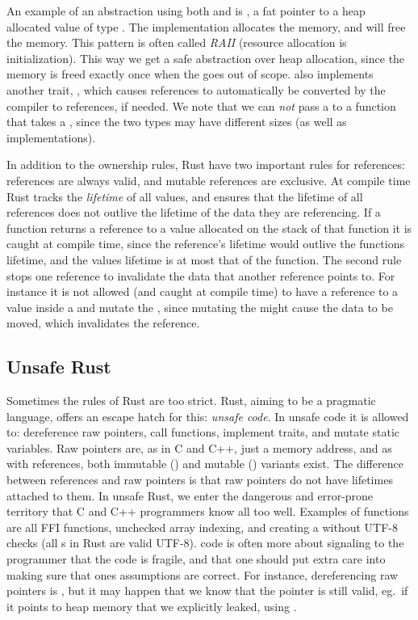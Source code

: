 \documentclass[b5paper]{report}
\begin{document}
An example of an abstraction using both  and  is
, a fat pointer to a heap allocated value of type
. The  implementation allocates the memory, and 
will free the memory. This pattern is often called \emph{RAII} (resource
allocation is initialization). This way we get a safe abstraction over heap
allocation, since the memory is freed exactly once when the  goes out
of scope.   also implements another trait, , which
causes  references to automatically be converted by the compiler to
 references, if needed. We note that we can \emph{not} pass a
 to a function that takes a , since the two types may have
different sizes (as well as  implementations).

In addition to the ownership rules, Rust have two important rules for
references: references are always valid, and mutable references are exclusive.
At compile time Rust tracks the \emph{lifetime} of all values, and ensures that
the lifetime of all references does not outlive the lifetime of the data they
are referencing. If a function returns a reference to a value allocated on the
stack of that function it is caught at compile time, since the reference's
lifetime would outlive the functions lifetime, and the values lifetime is at
most that of the function. The second rule stops one reference to invalidate the
data that another reference points to. For instance it is not allowed (and
caught at compile time) to have a reference to a value inside a  and
mutate the , since mutating the  might cause the data to be
moved, which invalidates the reference.

\subsection{Unsafe Rust}

Sometimes the rules of Rust are too strict. Rust, aiming to be a pragmatic
language, offers an escape hatch for this: \emph{unsafe code}. In unsafe code it
is allowed to: dereference raw pointers, call  functions, implement
 traits, and mutate static variables. Raw pointers are, as in C and
C++, just a memory address, and as with references, both immutable () and mutable () variants exist. The difference between
references and raw pointers is that raw pointers do not have lifetimes attached
to them. In unsafe Rust, we enter the dangerous and error-prone territory that C
and C++ programmers know all too well. Examples of  functions are
all FFI functions, unchecked array indexing, and creating a 
without UTF-8 checks (all s in Rust are valid UTF-8). 
code is often more about signaling to the programmer that the code is fragile,
and that one should put extra care into making sure that ones assumptions are
correct. For instance, dereferencing raw pointers is , but it may
happen that we know that the pointer is still valid, eg.\ if it points to heap
memory that we explicitly leaked, using .
\end{document}
